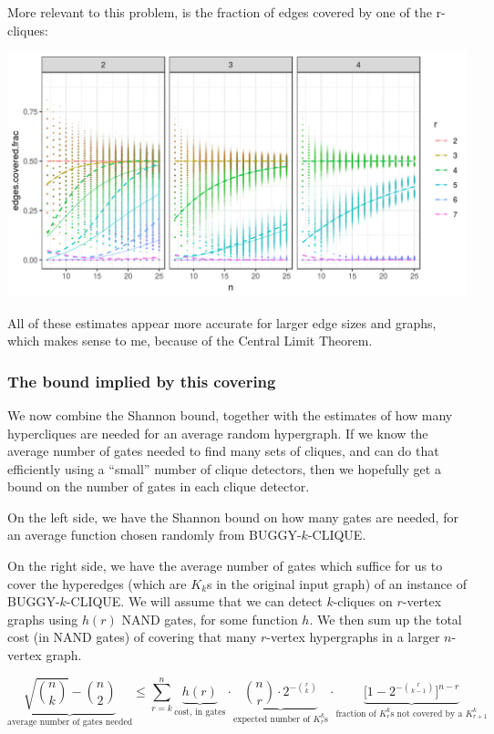 \documentclass[12pt]{article}
\theoremstyle{definition}
\begin{document}
More relevant to this problem, is the fraction of edges covered
by one of the r-cliques:

\includegraphics[width=1\textwidth]{cliqueCounter/R/fracCovered.png}

All of these
estimates appear more accurate for larger edge sizes and graphs, which
makes sense to me, because of the Central Limit Theorem.

\subsubsection{The bound implied by this covering}

We now combine the Shannon bound, together with the estimates of how many
hypercliques are needed for an average random hypergraph.
If we know the average number of gates needed to find many sets of cliques, and
can do that efficiently using a ``small'' number of clique detectors,
then we hopefully get a bound on the number of gates in each clique detector.

On the left side, we have
the Shannon bound on how many gates are needed, for an average function
chosen randomly from BUGGY-$k$-CLIQUE.

On the right side, we have
the average number of gates which suffice for us to cover the hyperedges
(which are $K_k$s in the original input graph) of an instance of
BUGGY-$k$-CLIQUE.
We will assume that we can detect $k$-cliques on $r$-vertex graphs using
$h(r)$ NAND gates, for some function $h$.
We then sum up the total cost (in NAND gates)
of covering that many $r$-vertex hypergraphs in a larger $n$-vertex graph.

\[
\underbrace{\sqrt{n \choose k} - {n \choose 2}}_\text{average number of gates needed}
\le \sum_{r=k}^n
\underbrace{h(r)}_\text{cost, in gates}
\cdot
\underbrace{{n \choose r} \cdot 2^{-{r \choose k}}}_\text{expected number of $K_r^k$s}
\cdot
\underbrace{\Big[1 - 2^{-{r \choose {k-1}}}\Big]^{n - r}}_\text{fraction of $K_r^k$s not covered by a $K_{r+1}^k$}
\]
\end{document}
